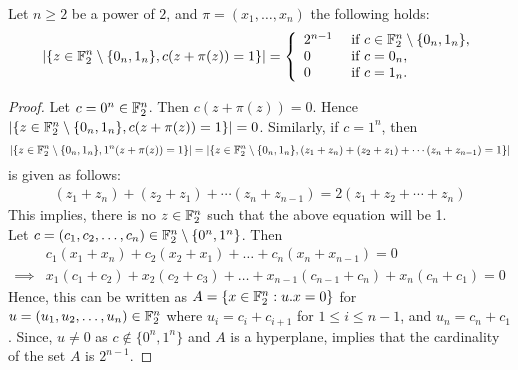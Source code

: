 \documentclass{llncs}
\begin{document}
\begin{proposition}
	Let $n\ge 2$ be a power of $2$, and $\pi= (x_1,\ldots,x_n)$ the following holds:
\[ |\{ z \in \mathbb{F}_2^{n} \setminus \{0_{n},1_{n}\},  c(z+\pi(z))=1   \}| 
= \left \{
\begin{array}{l l}
	2^{n-1}  & \text{ if } c \in \mathbb{F}_2^n \setminus \{0_n,1_n\}, \\
	0  & \text{ if } c=0_n,\\
	0 & \text{ if } c=1_n.
\end{array}\right.\]
	
\end{proposition}
\begin{proof}
	Let $ c = 0^n \in \mathbb{F}_2^n$. Then $c(z + \pi(z))=0$. Hence $|\{ z \in \mathbb{F}_2^{n} \setminus \{0_{n},1_{n}\}, c(z+\pi(z))=1   \}| = 0$. Similarly, if $c = 1^n$, then  $$|\{ z \in \mathbb{F}_2^{n} \setminus \{0_{n},1_{n}\}, 1^n(z+\pi(z))=1   \}| = |\{ z \in \mathbb{F}_2^{n} \setminus \{0_{n},1_{n}\}, (z_1 + z_n)+(z_2 + z_1)+ \cdots (z_n + z_{n-1})= 1 \}|$$ is given as follows:
	\begin{align*}
	(z_1 + z_n)+(z_2 + z_1)+ \cdots (z_n + z_{n-1}) = 2(z_1 + z_2 + \cdots + z_n) 
	\end{align*}
	This implies, there is no $z \in \mathbb{F}_2^n$ such that the above equation will be 1. \\
Let $c=(c_1,c_2,\ldots,c_n) \in \mathbb{F}_2^n \setminus \{0^n,1^n\}$. Then 
\begin{align*}
         & c_1(x_1 + x_n) + c_2(x_2 + x_1) + \ldots + c_n (x_n + x_{n-1})  = 0 \\
\implies &  x_1 ( c_1 + c_2) + x_2 (c_2 + c_3) + \ldots + x_{n-1}(c_{n-1} + c_n) + x_n(c_n + c_1)= 0  
\end{align*}
Hence, this can be written as $A= \{ x \in \mathbb{F}_2^n : u. x = 0\}$ for $ u = (u_1,u_2, \ldots,u_n) \in \mathbb{F}_2^n$ where $ u_i = c_i + c_{i+1}$ for $  1 \leq i \leq {n-1} $, and $u_n = c_n + c_1$. Since, $ u \neq 0 $ as $c \not\in \{0^n,1^n\}$ and $A$ is a hyperplane, implies that the cardinality of the set $A$ is $2^{n-1}$.
\end{proof}
\fi

\ifnum{}
%


\else


	
	
\end{document}
